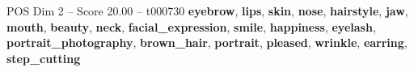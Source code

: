 \begin{textsample}{POS Dim 2 – Score 20.00 – t000730}  \label{ex:f2_pos_025}
\textbf{eyebrow}, \textbf{lips}, \textbf{skin}, \textbf{nose}, \textbf{hairstyle}, \textbf{jaw}, \textbf{mouth}, \textbf{beauty}, \textbf{neck}, \textbf{facial\_expression}, \textbf{smile}, \textbf{happiness}, \textbf{eyelash}, \textbf{portrait\_photography}, \textbf{brown\_hair}, \textbf{portrait}, \textbf{pleased}, \textbf{wrinkle}, \textbf{earring}, \textbf{step\_cutting}

\end{textsample}
